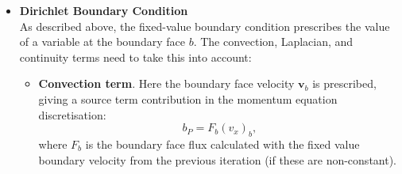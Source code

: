 \documentclass[final,3p,times,twocolumn]{elsarticle}
\begin{document}
\begin{itemize}
    \item \textbf{Dirichlet Boundary Condition} \\
        As described above, the fixed-value boundary condition prescribes the value of a variable at the boundary face $b$. The convection, Laplacian, and continuity terms need to take this into account: 
        \begin{itemize}
            \item \textbf{Convection term}. Here the boundary face velocity $\mathbf{v}_b$ is prescribed, giving a source term contribution in the momentum equation discretisation:
            \begin{equation}
                \label{eqn:diri_bc_conv}
                b_P = F_b (v_x)_b ,
            \end{equation}
            where $F_b$ is the boundary face flux calculated with the fixed value boundary velocity from the previous iteration (if these are non-constant).


\end{itemize}
\end{itemize}
\end{document}
